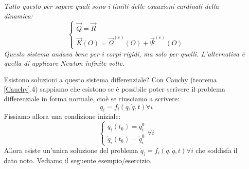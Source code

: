 \documentclass[11pt,a4paper,twoside]{article}
\theoremstyle{definition}
\begin{document}
\textit{Tutto questo per sapere quali sono i limiti delle equazioni cardinali della dinamica:
	\[\begin{cases}
		\vec Q = \vec R\\
		\vec K(O) = \vec \Omega^{(e)}(O) + \vec \Psi^{(e)}(O)
	\end{cases}\]
	Questo sistema andava bene per i corpi rigidi, ma solo per quelli. L'alternativa è quella di applicare Newton infinite volte.
}

Esistono soluzioni a questo sistema differenziale? Con Cauchy (teorema \ref{Cauchy}.4) sappiamo che esistono se è possibile poter scrivere il problema differenziale in forma normale, cioè se riusciamo a scrivere:
\[ \ddot q_i = f_i(q,\dot q, t) \forall i \]
Fissiamo allora una condizione iniziale:
\[ \begin{cases}
	q_i(t_0) = q^0_i\\
	\dot q_i(t_0) = \dot q^0_i
\end{cases} \forall i\]
Allora esiste un'unica soluzione del problema $\ddot q_i = f_i(q,\dot q, t) \forall i$ che soddisfa il dato noto. Vediamo il seguente esempio/esercizio.
\end{document}
